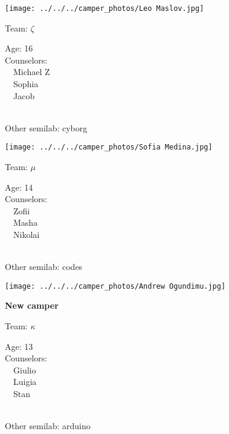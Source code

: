 \documentclass[10pt,letterpaper, landscape]{article}
\begin{document}
\horizontalshiftfornextsticker
\renewcommand{\baselinestretch}{1} \begin{sticker}
\noindent\begin{minipage}{0.5\textwidth}\texttt{[image: ../../../camper\_photos/Leo Maslov.jpg]}\end{minipage}\begin{minipage}{0.45\textwidth}
Team: {\Large $\zeta$}

Age:        16\\
Counselors: \\\ \ Michael Z\\\ \ Sophia\\\ \ Jacob\\
\end{minipage} \\ \vspace{0.07in}
Other semilab: cyborg
\end{sticker}
\horizontalshiftfornextsticker
\renewcommand{\baselinestretch}{1} \begin{sticker}
\noindent\begin{minipage}{0.5\textwidth}\texttt{[image: ../../../camper\_photos/Sofia Medina.jpg]}\end{minipage}\begin{minipage}{0.45\textwidth}
Team: {\Large $\mu$}

Age:        14\\
Counselors: \\\ \ Zofii\\\ \ Masha\\\ \ Nikolai\\
\end{minipage} \\ \vspace{0.07in}
Other semilab: codes
\end{sticker}
\verticalshiftfornextsticker
\renewcommand{\baselinestretch}{1} \begin{sticker}
\noindent\begin{minipage}{0.5\textwidth}\texttt{[image: ../../../camper\_photos/Andrew Ogundimu.jpg]}\end{minipage}\begin{minipage}{0.45\textwidth}
\textbf{New camper} 

Team: {\Large $\kappa$}

Age:        13\\
Counselors: \\\ \ Giulio\\\ \ Luigia\\\ \ Stan\\
\end{minipage} \\ \vspace{0.07in}
Other semilab: arduino
\end{sticker}
\end{document}
